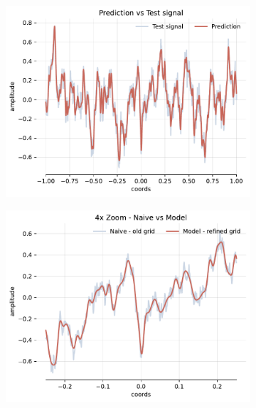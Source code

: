 \begin{figure}[h]
    \centering
    \begin{subfigure}[b]{0.32\textwidth}
        \centering
        \includegraphics[width=\textwidth]{img/ch4/pred-noise-1hl-32hf-w8.pdf}
        \caption{}
        \label{fig:pred-noise-1hl-32hf-w8}
    \end{subfigure}
    \begin{subfigure}[b]{0.32\textwidth}
        \centering
        \includegraphics[width=\textwidth]{img/ch4/4x-zoom-noise-1hl-32hf-w8.pdf}
        \caption{}
        \label{fig:4x-zoom-noise-1hl-32hf-w8}
    \end{subfigure}

\end{figure}
